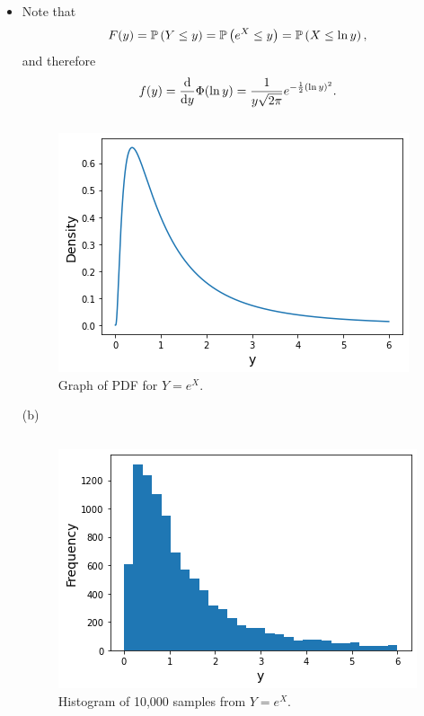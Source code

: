 \begin{ex}
  \begin{itemize}[(a)]
    \item
          Note that
          \[
            F(y)
            =\P{Y\leq y}
            =\P{e^X \leq y}
            =\P{X \leq \ln {y}},
          \]
          and therefore
          \[
            f(y)
            =\frac{\d}{\d{y}}\Phi(\ln {y})
            =\frac{1}{y\sqrt{2\pi}}e^{-\frac{1}{2}(\ln{y})^2}.
          \]

          \inputminted{python}{src/02-13a.py}
          \begin{figure}[H]
            \centering
            \includegraphics[scale=0.7]{part1/ch02-13a}
            \caption{Graph of PDF for $Y=e^X$.}
          \end{figure}

    \item[(b)]
          \inputminted{python}{src/02-13b.py}

          \begin{figure}[H]
            \centering
            \includegraphics[scale=0.7]{part1/ch02-13b}
            \caption{Histogram of 10,000 samples from $Y=e^X$.}
          \end{figure}
  \end{itemize}
\end{ex}

